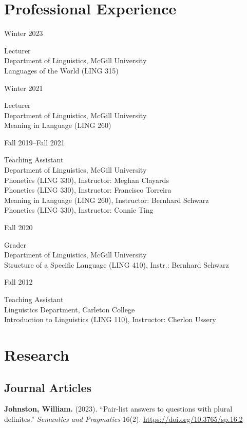 \documentclass[11pt,oneside,DIV=9,parskip=off]{scrarticle} %
\newlength{\leftcolwidth}
\newlength{\rightcolwidth}
\newlength{\spacingbefore}
\newlength{\spacingafter}
\newcommand{\myonecol}[1]{%
	\vspace{\spacingbefore}%
	\begin{minipage}[t]{\linewidth}%
		\strut#1%
	\end{minipage}%
	\vspace{\spacingafter}\par%
	}
\newcommand{\mytwocol}[2]{%
	\vspace{\spacingbefore}%
	\begin{minipage}[t]{\leftcolwidth}%
		\strut#1%
	\end{minipage}%
	\begin{minipage}[t]{\rightcolwidth}%
		\strut#2%
	\end{minipage}%
	\vspace{\spacingafter}\par%
	}
\newcommand{\pub}[1]{%
	\myonecol{#1}%
	}
\newcommand{\cvline}[2]{%
	\mytwocol{#1}{#2}%
	}
\begin{document}
\section{Professional Experience}
\cvline{Winter 2023}{%
	Lecturer\\
	Department of Linguistics, McGill University\\
	Languages of the World (LING 315)}
\cvline{Winter 2021}{%
	Lecturer\\
	Department of Linguistics, McGill University\\
	Meaning in Language (LING 260)}
\cvline{Fall 2019--Fall 2021}{%
	Teaching Assistant\\
	Department of Linguistics, McGill University\\
	Phonetics (LING 330), Instructor: Meghan Clayards\\
	Phonetics (LING 330), Instructor: Francisco Torreira\\
	Meaning in Language (LING 260), Instructor: Bernhard Schwarz\\
	Phonetics (LING 330), Instructor: Connie Ting}
\cvline{Fall 2020}{%
	Grader\\
	Department of Linguistics, McGill University\\
	Structure of a Specific Language (LING 410), Instr.: Bernhard Schwarz}
\cvline{Fall 2012}{%
	Teaching Assistant\\
	Linguistics Department, Carleton College\\
	Introduction to Linguistics (LING 110), Instructor: Cherlon Ussery}

\section{Research}


\subsection{Journal Articles}
\pub{\textbf{Johnston, William.} (2023). ``Pair-list answers to questions with plural definites.'' \textit{Semantics and Pragmatics} 16(2). \href{https://doi.org/10.3765/sp.16.2}{https://doi.org/10.3765/sp.16.2}}
\end{document}
